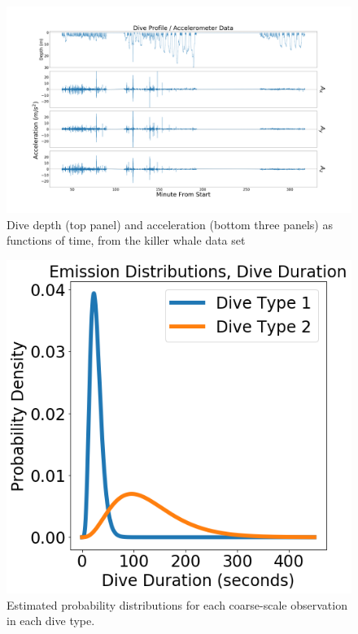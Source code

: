 
\begin{figure}[ht]
	\centering
	\includegraphics[width=5in]{../Plots/raw_data.png}
	\caption{Dive depth (top panel) and acceleration (bottom three panels) as functions of time, from the killer whale data set}
	\label{fig:data}
\end{figure}

\begin{figure}[ht]
	\centering
	\includegraphics[width=5in]{../Plots/coarse-emissions.png}
	\caption{Estimated probability distributions for each coarse-scale observation in each dive type.}
	\label{fig:coarse_emis}
\end{figure}

